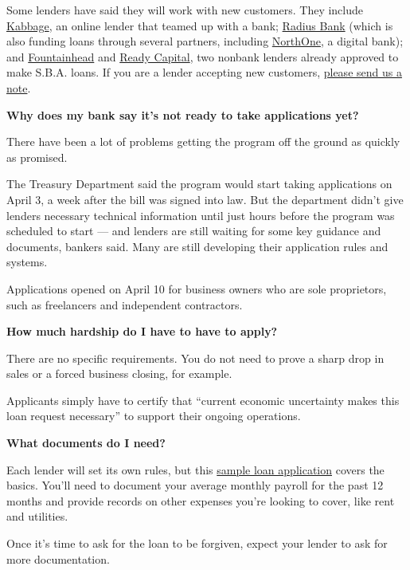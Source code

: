 Some lenders have said they will work with new customers. They include
\href{https://www.kabbage.com/}{Kabbage}, an online lender that teamed
up with a bank;
\href{https://radiusbank.com/business/sba-loans/paycheck-protection-program/}{Radius
Bank} (which is also funding loans through several partners, including
\href{https://www.northone.com/sba-loan-application}{NorthOne}, a
digital bank); and
\href{https://www.fountainheadcc.com/ppp/}{Fountainhead} and
\href{https://ppp.readycapital.com/}{Ready Capital}, two nonbank lenders
already approved to make S.B.A. loans. If you are a lender accepting new
customers, \href{mailto:stacy.cowley@NYTimes.com}{please send us a
note}.

\textbf{Why does my bank say it's not ready to take applications yet?}

There have been a lot of problems getting the program off the ground as
quickly as promised.

The Treasury Department said the program would start taking applications
on April 3, a week after the bill was signed into law. But the
department didn't give lenders necessary technical information until
just hours before the program was scheduled to start --- and lenders are
still waiting for some key guidance and documents, bankers said. Many
are still developing their application rules and systems.

Applications opened on April 10 for business owners who are sole
proprietors, such as freelancers and independent contractors.

\textbf{How much hardship do I have to have to apply?}

There are no specific requirements. You do not need to prove a sharp
drop in sales or a forced business closing, for example.

Applicants simply have to certify that ``current economic uncertainty
makes this loan request necessary'' to support their ongoing operations.

\textbf{What documents do I need?}

Each lender will set its own rules, but this
\href{https://home.treasury.gov/system/files/136/Paycheck-Protection-Program-Application-3-30-2020-v3.pdf}{sample
loan application} covers the basics. You'll need to document your
average monthly payroll for the past 12 months and provide records on
other expenses you're looking to cover, like rent and utilities.

Once it's time to ask for the loan to be forgiven, expect your lender to
ask for more documentation.

